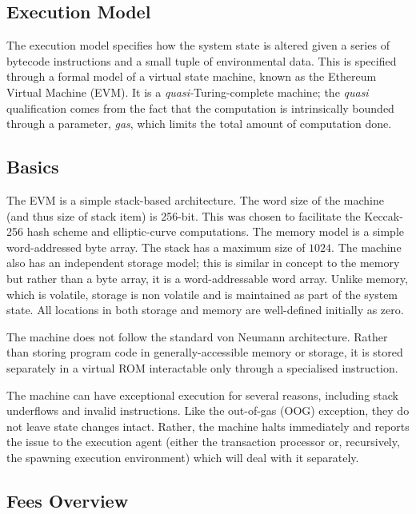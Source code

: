 \documentclass[9pt,oneside]{amsart}
\begin{document}
\begin{multicols}{2}
\section{Execution Model} \label{ch:model}

The execution model specifies how the system state is altered given a series of bytecode instructions and a small tuple of environmental data. This is specified through a formal model of a virtual state machine, known as the Ethereum Virtual Machine (EVM). It is a \textit{quasi-}Turing-complete machine; the \textit{quasi} qualification comes from the fact that the computation is intrinsically bounded through a parameter, \textit{gas}, which limits the total amount of computation done.

\subsection{Basics}

The EVM is a simple stack-based architecture. The word size of the machine (and thus size of stack item) is 256-bit. This was chosen to facilitate the Keccak-256 hash scheme and elliptic-curve computations. The memory model is a simple word-addressed byte array. The stack has a maximum size of $1024$. The machine also has an independent storage model; this is similar in concept to the memory but rather than a byte array, it is a word-addressable word array. Unlike memory, which is volatile, storage is non volatile and is maintained as part of the system state. All locations in both storage and memory are well-defined initially as zero.

The machine does not follow the standard von Neumann architecture. Rather than storing program code in generally-accessible memory or storage, it is stored separately in a virtual ROM interactable only through a specialised instruction.

The machine can have exceptional execution for several reasons, including stack underflows and invalid instructions. Like the out-of-gas (OOG) exception, they do not leave state changes intact. Rather, the machine halts immediately and reports the issue to the execution agent (either the transaction processor or, recursively, the spawning execution environment) which will deal with it separately.

\subsection{Fees Overview}


\end{multicols}
\end{document}
